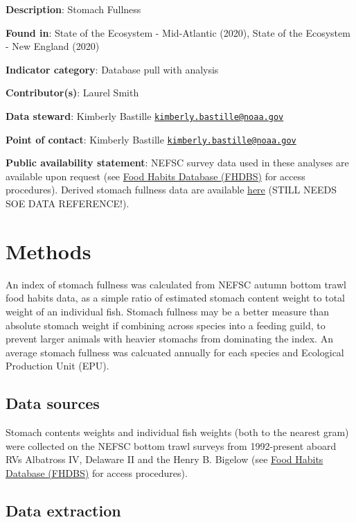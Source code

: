 \documentclass[
]{book}
\begin{document}
\textbf{Description}: Stomach Fullness

\textbf{Found in}: State of the Ecosystem - Mid-Atlantic (2020), State of the Ecosystem - New England (2020)

\textbf{Indicator category}: Database pull with analysis

\textbf{Contributor(s)}: Laurel Smith

\textbf{Data steward}: Kimberly Bastille \href{mailto:kimberly.bastille@noaa.gov}{\nolinkurl{kimberly.bastille@noaa.gov}}

\textbf{Point of contact}: Kimberly Bastille \href{mailto:kimberly.bastille@noaa.gov}{\nolinkurl{kimberly.bastille@noaa.gov}}

\textbf{Public availability statement}: NEFSC survey data used in these analyses are available upon request (see \href{https://inport.nmfs.noaa.gov/inport}{Food Habits Database (FHDBS)} for access procedures). Derived stomach fullness data are available \href{https://comet.nefsc.noaa.gov/erddap/tabledap/}{here} (STILL NEEDS SOE DATA REFERENCE!).

\hypertarget{methods-40}{%
\section{Methods}\label{methods-40}}

An index of stomach fullness was calculated from NEFSC autumn bottom trawl food habits data, as a simple ratio of estimated stomach content weight to total weight of an individual fish. Stomach fullness may be a better measure than absolute stomach weight if combining across species into a feeding guild, to prevent larger animals with heavier stomachs from dominating the index. An average stomach fullness was calcuated annually for each species and Ecological Production Unit (EPU).

\hypertarget{data-sources-40}{%
\subsection{Data sources}\label{data-sources-40}}

Stomach contents weights and individual fish weights (both to the nearest gram) were collected on the NEFSC bottom trawl surveys from 1992-present aboard RVs Albatross IV, Delaware II and the Henry B. Bigelow (see \href{https://inport.nmfs.noaa.gov/inport}{Food Habits Database (FHDBS)} for access procedures).

\hypertarget{data-extraction-31}{%
\subsection{Data extraction}\label{data-extraction-31}}
\end{document}
